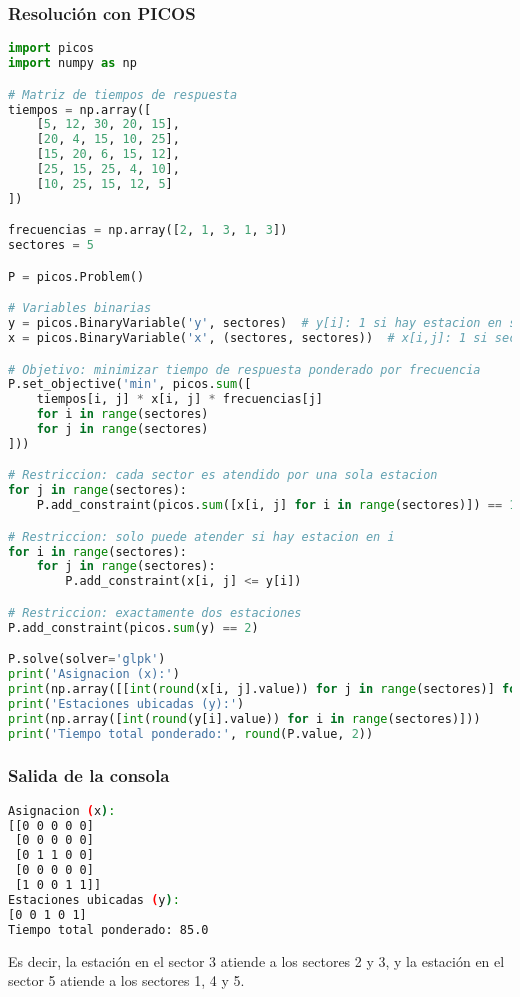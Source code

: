 \documentclass[12pt]{article}
\begin{document}
\subsubsection{Resolución con PICOS}
\begin{lstlisting}[language=Python]
import picos
import numpy as np

# Matriz de tiempos de respuesta
tiempos = np.array([
    [5, 12, 30, 20, 15],
    [20, 4, 15, 10, 25],
    [15, 20, 6, 15, 12],
    [25, 15, 25, 4, 10],
    [10, 25, 15, 12, 5]
])

frecuencias = np.array([2, 1, 3, 1, 3])
sectores = 5

P = picos.Problem()

# Variables binarias
y = picos.BinaryVariable('y', sectores)  # y[i]: 1 si hay estacion en sector i
x = picos.BinaryVariable('x', (sectores, sectores))  # x[i,j]: 1 si sector j es atendido por estacion en i

# Objetivo: minimizar tiempo de respuesta ponderado por frecuencia
P.set_objective('min', picos.sum([
    tiempos[i, j] * x[i, j] * frecuencias[j]
    for i in range(sectores)
    for j in range(sectores)
]))

# Restriccion: cada sector es atendido por una sola estacion
for j in range(sectores):
    P.add_constraint(picos.sum([x[i, j] for i in range(sectores)]) == 1)

# Restriccion: solo puede atender si hay estacion en i
for i in range(sectores):
    for j in range(sectores):
        P.add_constraint(x[i, j] <= y[i])

# Restriccion: exactamente dos estaciones
P.add_constraint(picos.sum(y) == 2)

P.solve(solver='glpk')
print('Asignacion (x):')
print(np.array([[int(round(x[i, j].value)) for j in range(sectores)] for i in range(sectores)]))
print('Estaciones ubicadas (y):')
print(np.array([int(round(y[i].value)) for i in range(sectores)]))
print('Tiempo total ponderado:', round(P.value, 2))

\end{lstlisting}

\subsubsection{Salida de la consola}

\begin{lstlisting}[language=bash,backgroundcolor=\color{black},basicstyle=\color{white}\ttfamily,numbers=none]
Asignacion (x):
[[0 0 0 0 0]
 [0 0 0 0 0]
 [0 1 1 0 0]
 [0 0 0 0 0]
 [1 0 0 1 1]]
Estaciones ubicadas (y):
[0 0 1 0 1]
Tiempo total ponderado: 85.0
\end{lstlisting}

Es decir, la estación en el sector 3 atiende a los sectores 2 y 3, y la estación en el sector 5 atiende a los sectores 1, 4 y 5.
\end{document}
